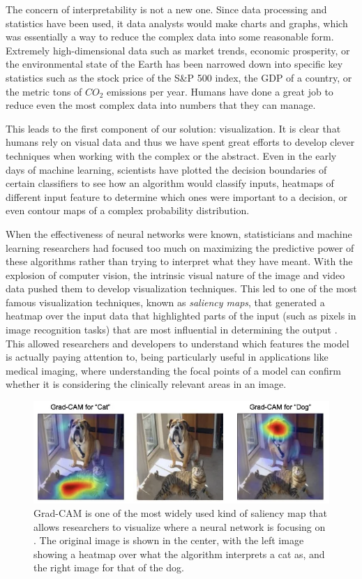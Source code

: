 \documentclass[10pt]{article}
\begin{document}
    The concern of interpretability is not a new one. Since data processing and statistics have been used, it data analysts would make charts and graphs, which was essentially a way to reduce the complex data into some reasonable form. Extremely high-dimensional data such as market trends, economic prosperity, or the environmental state of the Earth has been narrowed down into specific key statistics such as the stock price of the S\&P 500 index, the GDP of a country, or the metric tons of $C O_2$ emissions per year. Humans have done a great job to reduce even the most complex data into numbers that they can manage. 

    This leads to the first component of our solution: visualization. It is clear that humans rely on visual data and thus we have spent great efforts to develop clever techniques when working with the complex or the abstract. Even in the early days of machine learning, scientists have plotted the decision boundaries of certain classifiers to see how an algorithm would classify inputs, heatmaps of different input feature to determine which ones were important to a decision, or even contour maps of a complex probability distribution. 

    When the effectiveness of neural networks were known, statisticians and machine learning researchers had focused too much on maximizing the predictive power of these algorithms rather than trying to interpret what they have meant. With the explosion of computer vision, the intrinsic visual nature of the image and video data pushed them to develop visualization techniques. This led to one of the most famous visualization techniques, known as \textit{saliency maps}, that generated a heatmap over the input data that highlighted parts of the input (such as pixels in image recognition tasks) that are most influential in determining the output \cite{cam}. This allowed researchers and developers to understand which features the model is actually paying attention to, being particularly useful in applications like medical imaging, where understanding the focal points of a model can confirm whether it is considering the clinically relevant areas in an image. 

    \begin{figure}[H]
      \centering 
      \includegraphics[scale=0.6]{img/gradcam.png}
      \caption{Grad-CAM is one of the most widely used kind of saliency map that allows researchers to visualize where a neural network is focusing on \cite{gradcam}. The original image is shown in the center, with the left image showing a heatmap over what the algorithm interprets a cat as, and the right image for that of the dog. } 
      \label{fig:gradcam}
    \end{figure}
\end{document}
